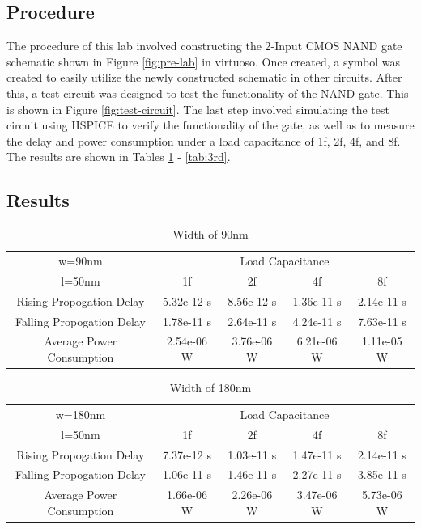 \documentclass[12pt]{article}
\begin{document}
\subsection{Procedure}
The procedure of this lab involved constructing the 2-Input CMOS NAND gate schematic shown in Figure \ref{fig:pre-lab} in virtuoso. Once created, a symbol was created to easily utilize the newly constructed schematic in other circuits. After this, a test circuit was designed to test the functionality of the NAND gate. This is shown in Figure \ref{fig:test-circuit}. The last step involved simulating the test circuit using HSPICE to verify the functionality of the gate, as well as to measure the delay and power consumption under a load capacitance of 1f, 2f, 4f, and 8f. The results are shown in Tables \ref{tab:1st} - \ref{tab:3rd}.
\subsection{Results}
\begin{table}[H]
	\begin{center}
	\begin{tabular}{ |c|c|c|c|c| }
		\hline
		w=90nm &
		\multicolumn{4}{|c|}{Load Capacitance} \\
		\cline{2-5} l=50nm & 1f & 2f & 4f & 8f \\
		\hline
		Rising Propogation Delay & 5.32e-12 s & 8.56e-12 s & 1.36e-11 s & 2.14e-11 s \\
		\hline
		Falling Propogation Delay & 1.78e-11 s& 2.64e-11 s& 4.24e-11 s& 7.63e-11 s\\
		\hline
		Average Power Consumption & 2.54e-06 W& 3.76e-06 W& 6.21e-06 W& 1.11e-05 W\\
		\hline
	\end{tabular}
	\end{center}
	\caption{Width of 90nm}
	\label{tab:1st}
\end{table}

\begin{table}[H]
	\begin{center}
		\begin{tabular}{ |c|c|c|c|c| }
			\hline
			w=180nm &
			\multicolumn{4}{|c|}{Load Capacitance} \\
			\cline{2-5} l=50nm & 1f & 2f & 4f & 8f \\
			\hline
			Rising Propogation Delay &7.37e-12 s & 1.03e-11 s & 1.47e-11 s & 2.14e-11 s \\
			\hline
			Falling Propogation Delay & 1.06e-11 s& 1.46e-11 s& 2.27e-11 s& 3.85e-11 s \\
			\hline
			Average Power Consumption & 1.66e-06 W& 2.26e-06 W& 3.47e-06 W& 5.73e-06 W \\
			\hline
		\end{tabular}
	\end{center}
	\caption{Width of 180nm}
	\label{tab:2nd}
\end{table}
\end{document}
